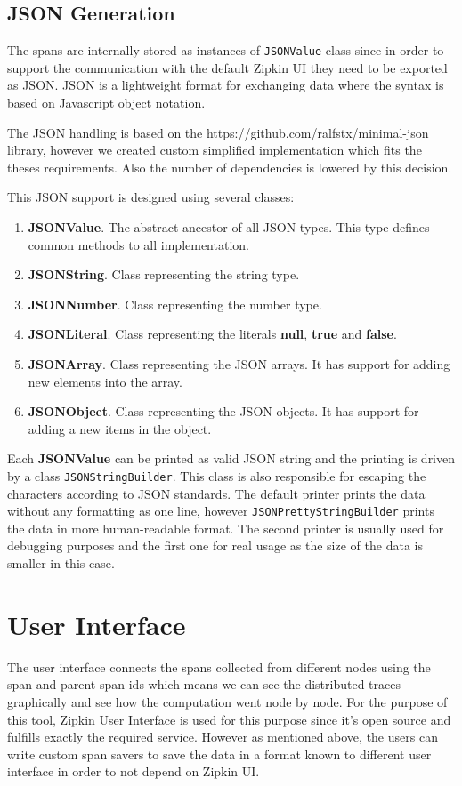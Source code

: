 \subsection{JSON Generation}
The spans are internally stored as instances of \texttt{JSONValue} class since in order to support the communication with the default Zipkin UI they need to be exported as JSON. JSON is a lightweight format for exchanging data where the syntax is based on Javascript object notation.

The JSON handling is based on the https://github.com/ralfstx/minimal-json library, however we created custom simplified implementation which fits the theses requirements. Also the number of dependencies is lowered by this decision. 

This JSON support is designed using several classes:
\begin{enumerate}
	\item \textbf{JSONValue}. The abstract ancestor of all JSON types. This type defines common methods to all implementation.
	\item \textbf{JSONString}. Class representing the string type.
	\item \textbf{JSONNumber}. Class representing the number type.
	\item \textbf{JSONLiteral}. Class representing the literals \textbf{null}, \textbf{true} and \textbf{false}.
	\item \textbf{JSONArray}. Class representing the JSON arrays. It has support for adding new elements into the array.
	\item \textbf{JSONObject}. Class representing the JSON objects. It has support for adding a new items in the object.
\end{enumerate}

Each \textbf{JSONValue} can be printed as valid JSON string and the printing is driven by a class \texttt{JSONStringBuilder}. This class is also responsible for escaping the characters according to JSON standards. The default printer prints the data without any formatting as one line, however \texttt{JSONPrettyStringBuilder} prints the data in more human-readable format. The second printer is usually used for debugging purposes and the first one for real usage as the size of the data is smaller in this case.

\section{User Interface}
The user interface connects the spans collected from different nodes using the span and parent span ids which means we can see the distributed traces graphically and see how the computation went node by node. For the purpose of this tool, Zipkin User Interface is used for this purpose since it's open source and fulfills exactly the required service. However as mentioned above, the users can write custom span savers to save the data in a format known to different user interface in order to not depend on Zipkin UI.

